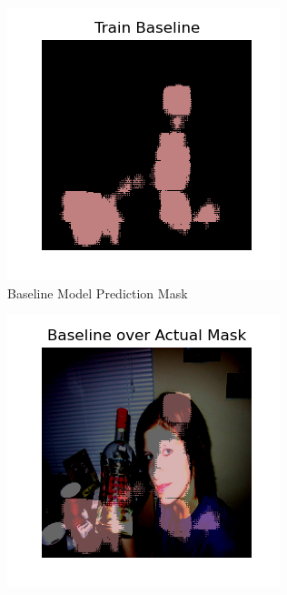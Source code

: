 \documentclass{article}
\begin{document}
\begin{figure}[h!]
  \centering
  \begin{subfigure}[b]{0.45\textwidth}
      \centering
      \includegraphics[width=\textwidth]{include/plots/base_pred.png}
      \caption{Baseline Model Prediction Mask}
      \label{fig:baseline_msk}
  \end{subfigure}
  \hfill %
  \begin{subfigure}[b]{0.45\textwidth}
      \centering
      \includegraphics[width=\textwidth]{include/plots/baseline_over_actual.png} %

\end{subfigure}
\end{figure}
\end{document}
